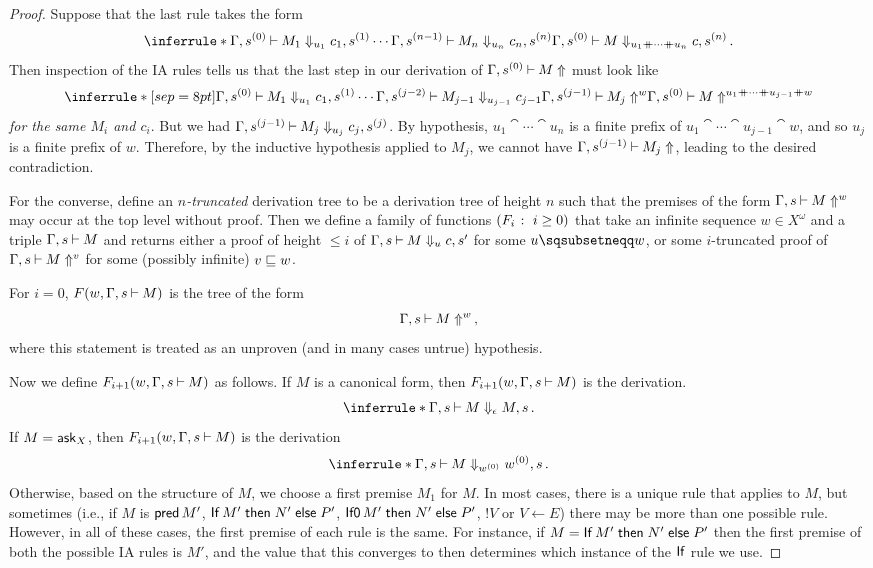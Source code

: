 \documentclass[11pt]{report}
\begin{document}
\begin{proof}
  Suppose that the last rule takes the form
  \[
    \inferrule*{\Gamma,s^{(0)}\ts M_1\converges_{u_1} c_1,s^{(1)} \\ \cdots \\ \Gamma,s^{(n-1)}\ts M_n\converges_{u_n} c_n,s^{(n)}}
    {\Gamma,s^{(0)} \ts M \converges_{u_1\cat \cdots\cat u_n} c,s^{(n)}}\,.
    \]
  Then inspection of the IA rules tells us that the last step in our derivation of $\Gamma,s^{(0)} \mathbin{\vdash} M\Uparrow$ must look like
  \[
    \inferrule*[sep=8pt]{\Gamma,s^{(0)}\ts M_1 \converges_{u_1} c_1,s^{(1)} \\ \cdots \\ \Gamma,s^{(j-2)} \ts M_{j-1} \converges_{u_{j-1}} c_{j-1} \\ \Gamma,s^{(j-1)}\ts M_j\diverges^w}
    {\Gamma,s^{(0)} \ts M \diverges^{u_1\cat \cdots \cat u_{j-1}\cat w}}
    \]
  \emph{for the same $M_i$ and $c_i$}.
  But we had $\Gamma,s^{(j-1)}\mathbin{\vdash} M_j\Downarrow_{u_j} c_j,s^{(j)}$.  
  By hypothesis, $u_1\cat \cdots \cat u_n$ is a finite prefix of $u_1 \cat \cdots \cat u_{j-1} \cat w$, and so $u_j$ is a finite prefix of $w$.  
  Therefore, by the inductive hypothesis applied to $M_j$, we cannot have $\Gamma,s^{(j-1)}\mathbin{\vdash} M_j\Uparrow$, leading to the desired contradiction.

  For the converse, define an \emph{$n$-truncated} derivation tree to be a derivation tree of height $n$ such that the premises of the form $\Gamma,s\mathbin{\vdash} M\Uparrow^w$ may occur at the top level without proof.  
  Then we define a family of functions $(F_i \;\colon\; i \ge 0)$ that take an infinite sequence $w\in X^\omega$ and a triple $\Gamma,s\mathbin{\vdash} M$ and returns either a proof of height $\le i$ of $\Gamma,s\mathbin{\vdash} M\Downarrow_u c,s'$ for some $u\pprefix w$, or some $i$-truncated proof of $\Gamma,s\mathbin{\vdash} M\Uparrow^v$ for some (possibly infinite) $v\sqsubseteq w$.

  For $i=0$, $F(w,\Gamma,s\mathbin{\vdash} M)$ is the tree of the form
  \[
    \Gamma,s\mathbin{\vdash} M\Uparrow^w\,,
    \]
  where this statement is treated as an unproven (and in many cases untrue) hypothesis.

  Now we define $F_{i+1}(w,\Gamma,s\mathbin{\vdash} M)$ as follows.  
  If $M$ is a canonical form, then $F_{i+1}(w,\Gamma,s\mathbin{\vdash} M)$ is the derivation.
  \[
    \inferrule*{ }{\Gamma,s\ts M\converges_\epsilon M,s}\,.
    \]
  If $M=\operatorname{{\mathsf{ask}}}_X$, then $F_{i+1}(w,\Gamma,s\mathbin{\vdash} M)$ is the derivation
  \[
    \inferrule*{ }{\Gamma,s\ts M\converges_{w^{(0)}} w^{(0)},s}\,.
    \]
  Otherwise, based on the structure of $M$, we choose a first premise $M_1$ for $M$.  
  In most cases, there is a unique \IAX rule that applies to $M$, but sometimes (i.e., if $M$ is $\operatorname{{\mathsf{pred}}} M'$, $\operatorname{\mathsf{If}} M' \mathrel{\mathsf{then}} N' \mathrel{\mathsf{else}} P'$, $\operatorname{{\mathsf{If0}}} M' \mathrel{\mathsf{then}} N' \mathrel{\mathsf{else}} P'$, $!V$ or $V\gets E$) there may be more than one possible rule.  
  However, in all of these cases, the first premise of each rule is the same.  
  For instance, if $M=\operatorname{\mathsf{If}} M' \mathrel{\mathsf{then}} N' \mathrel{\mathsf{else}} P'$ then the first premise of both the possible IA rules is $M'$, and the value that this converges to then determines which instance of the $\operatorname{\mathsf{If}}$ rule we use.


\end{proof}
\end{document}
